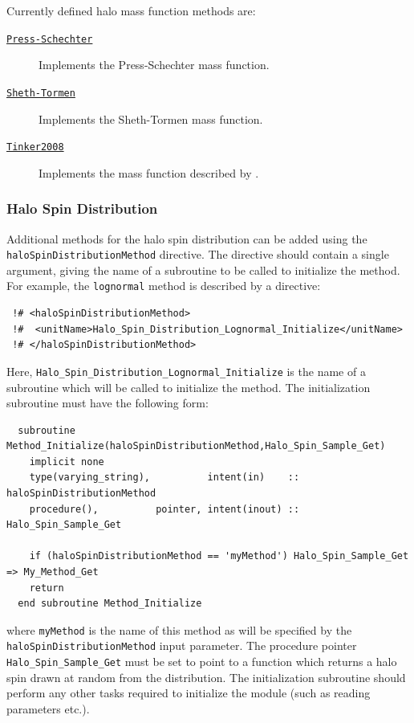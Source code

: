 Currently defined halo mass function methods are:
\begin{description}
 \item [\hyperlink{structure_formation.CDM.halo_mass_function.Press-Schechter.F90:halo_mass_function_press_schechter:halo_mass_function_press_schechter_tabulate}{{\tt Press-Schechter}}] Implements the Press-Schechter \citep{press_formation_1974} mass function.
 \item [\hyperlink{structure_formation.CDM.halo_mass_function.Sheth-Tormen.F90:halo_mass_function_sheth_tormen:halo_mass_function_sheth_tormen_tabulate}{{\tt Sheth-Tormen}}] Implements the Sheth-Tormen \citep{sheth_ellipsoidal_2001} mass function.
 \item [\hyperlink{structure_formation.CDM.halo_mass_function.Tinker2008.F90:halo_mass_function_tinker2008:halo_mass_function_tinker2008_tabulate}{{\tt Tinker2008}}] Implements the mass function described by \cite{tinker_towardhalo_2008}.
\end{description}

\subsubsection{Halo Spin Distribution}

Additional methods for the halo spin distribution can be added using the {\tt haloSpinDistributionMethod} directive. The directive should contain a single argument, giving the name of a subroutine to be called to initialize the method. For example, the {\tt lognormal} method is described by a directive:
\begin{verbatim}
 !# <haloSpinDistributionMethod>
 !#  <unitName>Halo_Spin_Distribution_Lognormal_Initialize</unitName>
 !# </haloSpinDistributionMethod>
\end{verbatim}
Here, {\tt Halo\_Spin\_Distribution\_Lognormal\_Initialize} is the name of a subroutine which will be called to initialize the method. The initialization subroutine must have the following form:
\begin{verbatim}
  subroutine Method_Initialize(haloSpinDistributionMethod,Halo_Spin_Sample_Get)
    implicit none
    type(varying_string),          intent(in)    :: haloSpinDistributionMethod
    procedure(),          pointer, intent(inout) :: Halo_Spin_Sample_Get
    
    if (haloSpinDistributionMethod == 'myMethod') Halo_Spin_Sample_Get => My_Method_Get
    return
  end subroutine Method_Initialize
\end{verbatim}
where {\tt myMethod} is the name of this method as will be specified by the {\tt haloSpinDistributionMethod} input parameter. The procedure pointer {\tt Halo\_Spin\_Sample\_Get} must be set to point to a function which returns a halo spin drawn at random from the distribution. The initialization subroutine should perform any other tasks required to initialize the module (such as reading parameters etc.).

